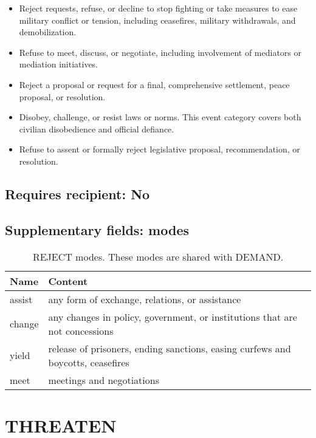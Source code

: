 \documentclass[11pt]{report}
\begin{document}
\begin{itemize}
\item Reject requests, refuse, or decline to stop fighting or take measures to ease military conflict or tension, including ceasefires, military withdrawals, and demobilization.
\item Refuse to meet, discuss, or negotiate, including involvement of mediators or mediation initiatives.
\item Reject a proposal or request for a final, comprehensive settlement, peace proposal, or resolution.
\item Disobey, challenge, or resist laws or norms. This event category covers both civilian disobedience and official defiance.
\item Refuse to assent or formally reject legislative proposal, recommendation, or resolution.
\end{itemize}

\subsection{Requires recipient: No}

\subsection{Supplementary fields: modes}

\begin{table}[htp]
\color{red}
\caption{REJECT modes. These modes are shared with DEMAND.}
\begin{center}
\begin{tabular}{|l|p{13cm}|}
\hline
Name & Content \\
\hline
assist & any form of exchange, relations, or assistance\\
change & any changes in policy, government, or institutions that are not concessions \\
yield & release of prisoners, ending sanctions, easing curfews and boycotts, ceasefires\\
meet & meetings and negotiations\\
\hline
\end{tabular}
\end{center}
\label{tab:rejectmode}
\end{table}%

\newpage  


\section{THREATEN}
\end{document}
